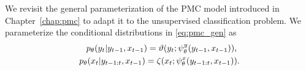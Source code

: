 
We revisit the general parameterization of the PMC model introduced in
Chapter~\ref{chap:pmc} to adapt it to the unsupervised classification problem.
We parameterize the
conditional distributions in \eqref{eq:pmc_gen} as
\begin{eqnarray}
\label{pmc-theta-1}
p_{\theta}(y_t|y_{t-1},x_{t-1})=\vartheta(y_t;\psi^{y}_{\theta}(y_{t-1},x_{t-1})) \text{, } \\
\label{pmc-theta-2}
p_{\theta}(x_t|y_{t-1:t},x_{t-1})=\zeta(x_t;\psi^{x}_{\theta}(y_{t-1:t},x_{t-1})) \text{.}
\end{eqnarray}




